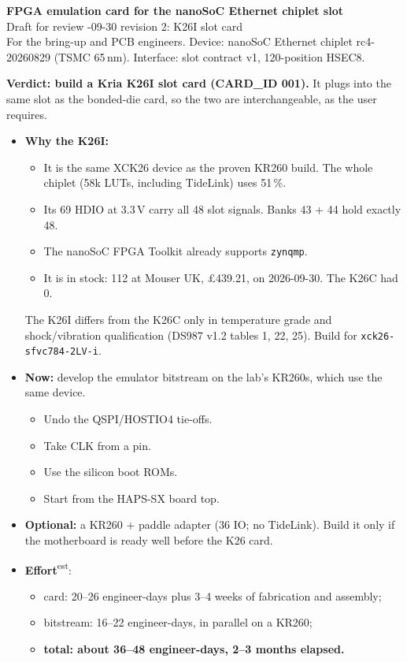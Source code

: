 \documentclass[10pt,a4paper]{article}
\newcommand\est{\textcolor{amber}{\textsuperscript{est}}}
\begin{document}
\begin{center}
{\LARGE\bfseries\color{accent} FPGA emulation card for the nanoSoC Ethernet chiplet slot}\\[3pt]
{\large Draft for review \quad\textbar{}-09-30 \quad\textbar\quad revision 2: K26I slot card}\\[2pt]
{\small\color{srcgray} For the bring-up and PCB engineers. Device: nanoSoC Ethernet chiplet rc4-20260829 (TSMC 65\,nm). Interface: slot contract v1, 120-position HSEC8.}
\end{center}
\vspace{-2pt}

\begin{verdict}
\textbf{Verdict: build a Kria K26I slot card (CARD\_ID 001).} It plugs into the same slot as the bonded-die card, so the two are interchangeable, as the user requires.
\begin{itemize}
\item \textbf{Why the K26I:}
  \begin{itemize}
  \item It is the same XCK26 device as the proven KR260 build. The whole chiplet (58k LUTs, including TideLink) uses 51\,\%.
  \item Its 69 HDIO at 3.3\,V carry all 48 slot signals. Banks 43 + 44 hold exactly 48.
  \item The nanoSoC FPGA Toolkit already supports \texttt{zynqmp}.
  \item It is in stock: 112 at Mouser UK, \pounds439.21, on 2026-09-30. The K26C had 0.
  \end{itemize}
  The K26I differs from the K26C only in temperature grade and shock/vibration qualification (DS987 v1.2 tables 1, 22, 25). Build for \texttt{xck26-sfvc784-2LV-i}.
\item \textbf{Now:} develop the emulator bitstream on the lab's KR260s, which use the same device.
  \begin{itemize}
  \item Undo the QSPI/HOSTIO4 tie-offs.
  \item Take CLK from a pin.
  \item Use the silicon boot ROMs.
  \item Start from the HAPS-SX board top.
  \end{itemize}
\item \textbf{Optional:} a KR260 + paddle adapter (36 IO; no TideLink). Build it only if the motherboard is ready well before the K26 card.
\item \textbf{Effort}\est:
  \begin{itemize}
  \item card: 20--26 engineer-days plus 3--4 weeks of fabrication and assembly;
  \item bitstream: 16--22 engineer-days, in parallel on a KR260;
  \item \textbf{total: about 36--48 engineer-days, 2--3 months elapsed.}
  \end{itemize}
\end{itemize}
\end{verdict}
\end{document}
